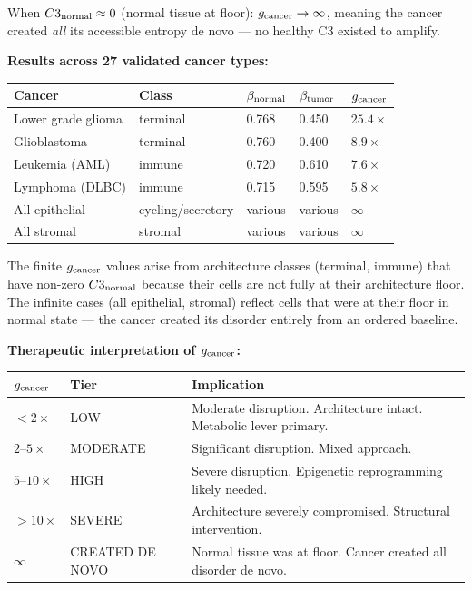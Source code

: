 \documentclass[12pt,a4paper]{article}
\begin{document}
When $C3_{\rm normal} \approx 0$ (normal tissue at floor):
$g_{\rm cancer} \to \infty$, meaning the cancer created \emph{all} its
accessible entropy de novo --- no healthy C3 existed to amplify.

\noindent \textbf{Results across 27 validated cancer types:}

\begin{center}
\renewcommand{\arraystretch}{1.2}
\begin{tabular}{lllll}
\toprule
\textbf{Cancer} & \textbf{Class} & $\beta_{\rm normal}$ & $\beta_{\rm tumor}$ &
$g_{\rm cancer}$ \\
\midrule
Lower grade glioma & terminal & 0.768 & 0.450 & $25.4\times$ \\
Glioblastoma       & terminal & 0.760 & 0.400 & $8.9\times$ \\
Leukemia (AML)     & immune   & 0.720 & 0.610 & $7.6\times$ \\
Lymphoma (DLBC)    & immune   & 0.715 & 0.595 & $5.8\times$ \\
All epithelial     & cycling/secretory & various & various & $\infty$ \\
All stromal        & stromal  & various & various & $\infty$ \\
\bottomrule
\end{tabular}
\end{center}

\noindent The finite $g_{\rm cancer}$ values arise from architecture classes
(terminal, immune) that have non-zero $C3_{\rm normal}$ because their cells
are not fully at their architecture floor.
The infinite cases (all epithelial, stromal) reflect cells that were at their
floor in normal state --- the cancer created its disorder entirely from an
ordered baseline.

\noindent \textbf{Therapeutic interpretation of $g_{\rm cancer}$:}

\begin{center}
\renewcommand{\arraystretch}{1.2}
\begin{tabular}{llp{6.0cm}}
\toprule
$g_{\rm cancer}$ & \textbf{Tier} & \textbf{Implication} \\
\midrule
$< 2\times$     & LOW           & Moderate disruption. Architecture intact. Metabolic lever primary. \\
$2$--$5\times$  & MODERATE      & Significant disruption. Mixed approach. \\
$5$--$10\times$ & HIGH          & Severe disruption. Epigenetic reprogramming likely needed. \\
$> 10\times$    & SEVERE        & Architecture severely compromised. Structural intervention. \\
$\infty$        & CREATED DE NOVO & Normal tissue was at floor. Cancer created all disorder de novo. \\
\bottomrule
\end{tabular}
\end{center}
\end{document}
